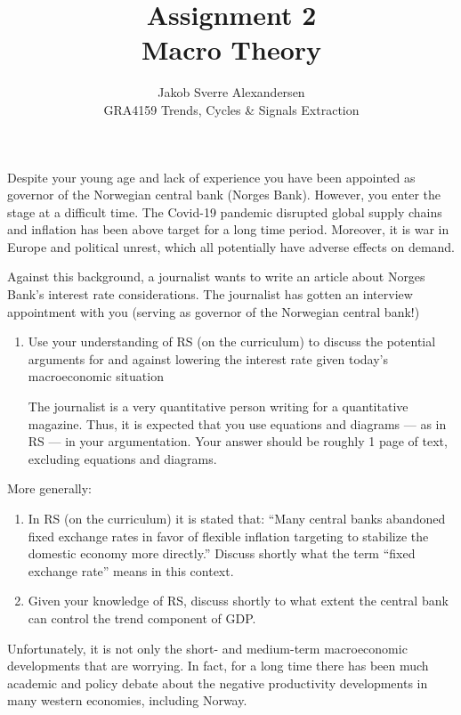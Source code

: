 \documentclass[10pt]{article}
\begin{document}
 
\title{Assignment 2 \\Macro Theory}
\author{Jakob Sverre Alexandersen\\
GRA4159 Trends, Cycles \& Signals Extraction}
\maketitle

Despite your young age and lack of experience you have been appointed as governor of the
Norwegian central bank (Norges Bank). However, you enter the stage at a difficult time. The
Covid-19 pandemic disrupted global supply chains and inflation has been above target for a
long time period. Moreover, it is war in Europe and political unrest, which all potentially have
adverse effects on demand.

Against this background, a journalist wants to write an article about Norges Bank's interest
rate considerations. The journalist has gotten an interview appointment with you (serving as
governor of the Norwegian central bank!)

\begin{enumerate}
    \item Use your understanding of RS (on the curriculum) to discuss the potential arguments for
    and against lowering the interest rate given today's macroeconomic situation

    The journalist is a very quantitative person writing for a quantitative magazine. Thus, it is
    expected that you use equations and diagrams --- as in RS --- in your argumentation. Your
    answer should be roughly 1 page of text, excluding equations and diagrams.
\end{enumerate}

More generally:

    \begin{enumerate}[resume]
    \item In RS (on the curriculum) it is stated that: “Many central banks abandoned fixed
    exchange rates in favor of flexible inflation targeting to stabilize the domestic economy
    more directly.” Discuss shortly what the term “fixed exchange rate” means in this
    context.
    \item Given your knowledge of RS, discuss shortly to what extent the central bank can control
    the trend component of GDP.
\end{enumerate}

Unfortunately, it is not only the short- and medium-term macroeconomic developments that
are worrying. In fact, for a long time there has been much academic and policy debate about
the negative productivity developments in many western economies, including Norway.
\end{document}
